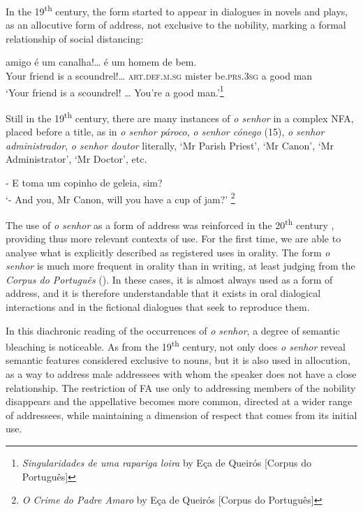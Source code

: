 \documentclass[output=paper]{langscibook}
\begin{document}
In the 19\textsuperscript{th} century, the form started to appear in dialogues in novels  and plays, as an allocutive form of address, not exclusive to the nobility, marking a formal relationship of social distancing:


\ea\label{ex:marques:14}
 amigo é um canalha!…                  é        {um homem de bem.} \\
        Your friend is a scoundrel!…  \textsc{art.def.m.sg}   mister       be.\textsc{prs.3sg}  {a good man}\\
\glt ‘Your friend is a scoundrel! … You’re a good man.’\footnote{\textit{Singularidades de uma rapariga loira} by Eça de Queirós [Corpus do Português]}\\
\z 

Still in the 19\textsuperscript{th} century, there are many instances of \textit{o senhor} in a complex NFA, placed before a title, as in \textit{o senhor pároco}, \textit{o senhor cónego} (15), \textit{o senhor administrador}, \textit{o senhor doutor} literally, ‘Mr Parish Priest’, ‘Mr Canon’, ‘Mr Administrator’, ‘Mr Doctor’, etc.


\ea\label{ex:marques:15}
- E  toma um copinho de geleia, sim? \\
‘- And you, Mr Canon, will you have a cup of jam?’ \footnote{\textit{O Crime do Padre Amaro} by Eça de Queirós [Corpus do Português]}\\
\z 

The use of \textit{o senhor} as a form of address was reinforced in the 20\textsuperscript{th} century \citep{Biderman1972}, providing thus more relevant contexts of use. For the first time, we are able to analyse what is explicitly described as registered uses in orality. The form \textit{o senhor} is much more frequent in orality than in writing, at least judging from the \textit{Corpus do Português} (\citealt{DaviesFerreira2016}). In these cases, it is almost always used as a form of address, and it is therefore understandable that it exists in oral dialogical interactions and in the fictional dialogues that seek to reproduce them. 



In this diachronic reading of the occurrences of \textit{o senhor}, a degree of semantic bleaching is noticeable. As from the 19\textsuperscript{th} century, not only does \textit{o senhor} reveal semantic features considered exclusive to nouns, but it is also used in allocution, as a way to address male addressees with whom the speaker does not have a close relationship. The restriction of FA use only to addressing members of the nobility disappears and the appellative becomes more common, directed at a wider range of addressees, while maintaining a dimension of respect that comes from its initial use.
\end{document}
